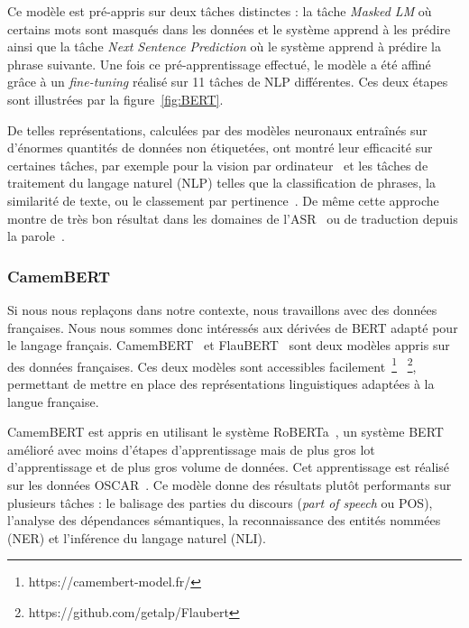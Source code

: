 Ce modèle est pré-appris sur deux tâches distinctes : la tâche \textit{Masked LM} où certains mots sont masqués dans les données et le système apprend à les prédire ainsi que la tâche \textit{Next Sentence Prediction} où le système apprend à prédire la phrase suivante. Une fois ce pré-apprentissage effectué, le modèle a été affiné grâce à un \textit{fine-tuning} réalisé sur 11 tâches de NLP différentes. Ces deux étapes sont illustrées par la figure~\ref{fig:BERT}.



De telles représentations, calculées par des modèles neuronaux entraînés sur d'énormes quantités de données non étiquetées, ont montré leur efficacité sur certaines tâches, par exemple pour la vision par ordinateur~\cite{Nanni2017} et les tâches de traitement du langage naturel (NLP) telles que la
classification de phrases, la similarité de texte, ou le classement par pertinence~\cite{Liu2019,Young2018,Yang2019}. De même cette approche montre de très bon résultat dans les domaines de l'ASR~\cite{Kahn2020,Liu2020} ou de traduction depuis la parole~\cite{Nguyen2020}.

\subsubsection{CamemBERT}
Si nous nous replaçons dans notre contexte, nous travaillons avec des données françaises. Nous nous sommes donc intéressés aux dérivées de BERT adapté pour le langage français. CamemBERT~\cite{Martin2020} et FlauBERT~\cite{Le2020} sont deux modèles appris sur des données françaises. Ces deux modèles sont accessibles facilement~\footnote{https://camembert-model.fr/} ~\footnote{https://github.com/getalp/Flaubert}, permettant de mettre en place des représentations linguistiques adaptées à la langue française.

CamemBERT est appris en utilisant le système RoBERTa~\cite{Liu2019Roberta}, un système BERT amélioré avec moins d'étapes d'apprentissage mais de plus gros lot d'apprentissage et de plus gros volume de données. Cet apprentissage est réalisé sur les données OSCAR~\cite{Ortizsuarez2019}. Ce modèle donne des résultats plutôt performants sur plusieurs tâches : le balisage des parties du discours (\textit{part of speech} ou POS), l'analyse des dépendances sémantiques, la reconnaissance des entités nommées (NER) et l'inférence du langage naturel (NLI).

